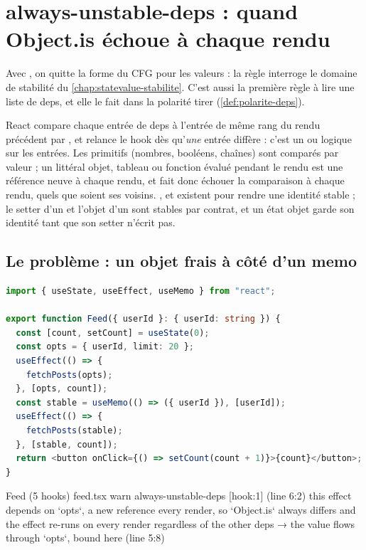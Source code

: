 \section{always-unstable-deps : quand Object.is échoue à chaque rendu}
\label{sec:regles-effets-always-unstable}

Avec , on quitte la forme du CFG pour les valeurs : la règle interroge le domaine de stabilité du \cref{chap:statevalue-stabilite}. C'est aussi la première règle à lire une liste de deps, et elle le fait dans la polarité \og tirer\fg{} (\cref{def:polarite-deps}).

\begin{react}
React compare chaque entrée de deps à l'entrée de même rang du rendu précédent par , et relance le hook dès qu'\emph{une} entrée diffère : c'est un \og ou\fg{} logique sur les entrées. Les primitifs (nombres, booléens, chaînes) sont comparés par valeur ; un littéral objet, tableau ou fonction évalué pendant le rendu est une référence neuve à chaque rendu, et fait donc échouer la comparaison à chaque rendu, quels que soient ses voisins. ,  et  existent pour rendre une identité stable ; le setter d'un  et l'objet d'un  sont stables par contrat, et un état objet garde son identité tant que son setter n'écrit pas.
\end{react}

\subsection{Le problème : un objet frais à côté d'un memo}

\begin{lstlisting}[language=TypeScript,caption={\file{/tmp/ch20/feed.tsx} : la même dep, fraîche puis mémoïsée},label={lst:regles-effets-feed}]
import { useState, useEffect, useMemo } from "react";

export function Feed({ userId }: { userId: string }) {
  const [count, setCount] = useState(0);
  const opts = { userId, limit: 20 };
  useEffect(() => {
    fetchPosts(opts);
  }, [opts, count]);
  const stable = useMemo(() => ({ userId }), [userId]);
  useEffect(() => {
    fetchPosts(stable);
  }, [stable, count]);
  return <button onClick={() => setCount(count + 1)}>{count}</button>;
}
\end{lstlisting}

\begin{sortie}
  Feed  (5 hooks)  feed.tsx
    warn   always-unstable-deps  [hook:1]  (line 6:2)  this effect depends on `opts`, a new reference every render, so `Object.is` always differs and the effect re-runs on every render regardless of the other deps
       → the value flows through `opts`, bound here (line 5:8)
\end{sortie}

